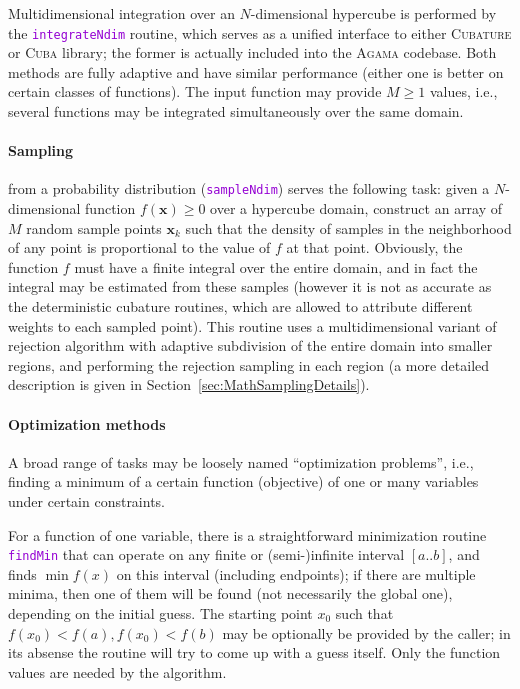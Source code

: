\documentclass[12pt]{article}
\newcommand{\Agama}{\textsc{Agama}\xspace}
\newcommand{\ttt}[1]{\textcolor{darkviolet}{\texttt{#1}}}
\newcommand{\bx}{\boldsymbol{x}}
\begin{document}
Multidimensional integration over an $N$-dimensional hypercube is performed by the \ttt{integrateNdim} routine, which serves as a unified interface to either \textsc{Cubature} or \textsc{Cuba} library; the former is actually included into the \Agama codebase. Both methods are fully adaptive and have similar performance (either one is better on certain classes of functions). The input function may provide $M\ge 1$ values, i.e., several functions may be integrated simultaneously over the same domain.

\paragraph{Sampling} \label{sec:Sampling}  from a probability distribution (\ttt{sampleNdim}) serves the following task: given a $N$-dimensional function $f(\bx)\ge 0$ over a hypercube domain, construct an array of $M$ random sample points $\bx_k$ such that the density of samples in the neighborhood of any point is proportional to the value of $f$ at that point. Obviously, the function $f$ must have a finite integral over the entire domain, and in fact the integral may be estimated from these samples (however it is not as accurate as the deterministic cubature routines, which are allowed to attribute different weights to each sampled point). This routine uses a multidimensional variant of rejection algorithm with adaptive subdivision of the entire domain into smaller regions, and performing the rejection sampling in each region (a more detailed description is given in Section~\ref{sec:MathSamplingDetails}).

\paragraph{Optimization methods}
A broad range of tasks may be loosely named ``optimization problems'', i.e., finding a minimum of a certain function (objective) of one or many variables under certain constraints.

For a function of one variable, there is a straightforward minimization routine \ttt{findMin} that can operate on any finite or (semi-)infinite interval $[a..b]$, and finds $\min f(x)$ on this interval (including endpoints); if there are multiple minima, then one of them will be found (not necessarily the global one), depending on the initial guess. The starting point $x_0$ such that  $f(x_0)<f(a), f(x_0)<f(b)$ may be optionally be provided by the caller; in its absense the routine will try to come up with a guess itself. Only the function values are needed by the algorithm.
\end{document}
